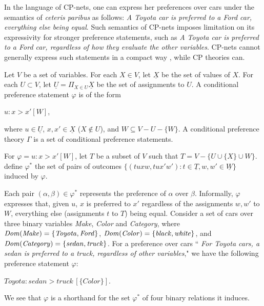 In the language of CP-nets, one can express her preferences over cars
under the semantics of \textit{ceteris paribus} as follows:
\textit{A Toyota car is preferred to a Ford car, everything else being equal}.
Such semantics of CP-nets imposes limitation on its expressivity for
stronger preference statements, such as
\textit{A Toyota car is preferred to a Ford car, regardless of how they
evaluate the other variables}.
CP-nets cannot generally express such statements in a compact way
\cite{Wilson04extendingcp-nets}, while CP theories can.

\begin{definition}
	Let $V$ be a set of variables.  For each $X\in V$, let $\underline{X}$
	be the set of values of $X$.  For each $U \subset V$, let
	$\underline{U}=\Pi_{X\in U} \underline{X}$ be the set of assignments to $U$.
	A conditional preference statement $\varphi$ is of the form
	\begin{center}
		$u : x > x' [W]$,
	\end{center}
	where $u \in \underline{U}$, $x,x' \in \underline{X}$ ($X \not \in U$),
	and $W \subseteq V-U-\{W\}$.
	A conditional preference theory $\Gamma$ is a set of 
	conditional preference statements.
\end{definition}


\begin{definition}
	For $\varphi=u:x>x'[W]$, let $T$ be a subset of $V$ such that
	$T=V-\{U \cup \{X\} \cup W\}$.
	define $\varphi^*$ the set of pairs of outcomes
	$\{(tuxw,tux'w'):t\in \underline{T}, w,w' \in \underline{W}\}$ induced
	by $\varphi$.
\end{definition}
Each pair $(\alpha,\beta) \in \varphi^*$ represents the preference of
$\alpha$ over $\beta$.  Informally, $\varphi$ expresses that,
given $u$, $x$ is preferred to $x'$ regardless of the assignments $w,w'$
to $W$, everything else (assignments $t$ to $T$) being equal.
Consider a set of cars over three binary variables \textit{Make}, \textit{Color}
and \textit{Category}, where $\it{Dom}(Make)=\{Toyota,Ford\}$,
$\it{Dom}(Color)=\{black,white\}$, and $\it{Dom}(Category)=\{sedan, truck\}$.
For a preference over cars ``
\textit{For Toyota cars, a sedan is preferred to a truck, regardless of other variables},"
we have the following preference statement $\varphi$:
\begin{center}
	$\textit{Toyota} : \textit{sedan} > \textit{truck} \, [\{Color\}]$.
\end{center}
We see that $\varphi$ is a shorthand for the set $\varphi^*$ of four binary relations
it induces.


